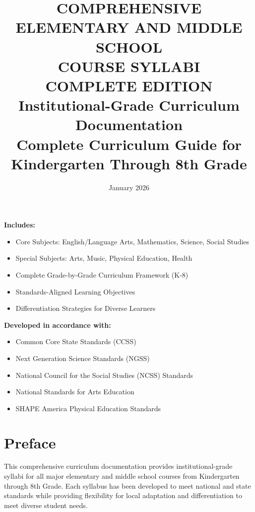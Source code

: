 \documentclass[11pt,letterpaper]{report}
\title{\textbf{COMPREHENSIVE ELEMENTARY AND MIDDLE SCHOOL\\
COURSE SYLLABI\\
COMPLETE EDITION}\\
\vspace{0.5cm}
\large Institutional-Grade Curriculum Documentation\\
Complete Curriculum Guide for Kindergarten Through 8th Grade}
\author{}
\date{January 2026}
\begin{document}
\maketitle

\begin{center}
\textbf{Includes:}\\
\vspace{0.3cm}
\begin{itemize}
    \item Core Subjects: English/Language Arts, Mathematics, Science, Social Studies
    \item Special Subjects: Arts, Music, Physical Education, Health
    \item Complete Grade-by-Grade Curriculum Framework (K-8)
    \item Standards-Aligned Learning Objectives
    \item Differentiation Strategies for Diverse Learners
\end{itemize}

\vspace{0.5cm}

\textbf{Developed in accordance with:}\\
\vspace{0.3cm}
\begin{itemize}
    \item Common Core State Standards (CCSS)
    \item Next Generation Science Standards (NGSS)
    \item National Council for the Social Studies (NCSS) Standards
    \item National Standards for Arts Education
    \item SHAPE America Physical Education Standards
\end{itemize}
\end{center}

\clearpage

\tableofcontents

\clearpage

\chapter*{Preface}

This comprehensive curriculum documentation provides institutional-grade syllabi for all major elementary and middle school courses from Kindergarten through 8th Grade. Each syllabus has been developed to meet national and state standards while providing flexibility for local adaptation and differentiation to meet diverse student needs.
\end{document}
